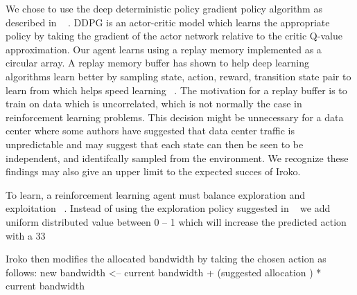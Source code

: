 We chose to use the deep deterministic policy gradient policy algorithm as described in ~\cite{DDPG} . DDPG is an actor-critic model which learns the appropriate policy by taking the gradient of the actor network relative to the critic Q-value approximation.  Our agent learns using a replay memory implemented as a circular array. A replay memory buffer has shown to help deep learning algorithms learn better by sampling state, action, reward, transition state pair to learn from which helps speed learning ~\cite{DQLearning}. The motivation for a replay buffer is to train on data which is uncorrelated, which is not normally the case in reinforcement learning problems. This decision might be unnecessary for a data center where some authors have suggested that data center traffic is unpredictable and may suggest that each state can then be seen to be independent, and identifcally sampled from the environment. We recognize these findings may also give an upper limit to the expected succes of Iroko. 

To learn, a reinforcement learning agent must balance exploration and exploitation ~\cite{Sutton:1998:IRL:551283}. Instead of using the exploration policy suggested in ~\cite{DDPG} we add uniform distributed value between 0 – 1 which will increase the predicted action with a 33%

Iroko then modifies the allocated bandwidth by taking the chosen action as follows:
new bandwidth <-- current bandwidth + (suggested allocation ) * current bandwidth